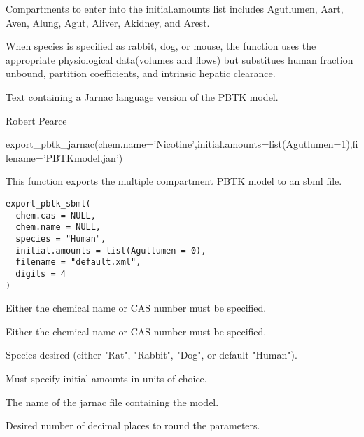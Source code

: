 \documentclass[a4paper]{book}
\begin{document}
%
\begin{Details}\relax
Compartments to enter into the initial.amounts list includes Agutlumen,
Aart, Aven, Alung, Agut, Aliver, Akidney, and Arest.

When species is specified as rabbit, dog, or mouse, the function uses the
appropriate physiological data(volumes and flows) but substitues human
fraction unbound, partition coefficients, and intrinsic hepatic clearance.
\end{Details}
%
\begin{Value}
Text containing a Jarnac language version of the PBTK model.
\end{Value}
%
\begin{Author}\relax
Robert Pearce
\end{Author}
%
\begin{Examples}
\begin{ExampleCode}


export_pbtk_jarnac(chem.name='Nicotine',initial.amounts=list(Agutlumen=1),filename='PBTKmodel.jan')


\end{ExampleCode}
\end{Examples}
%
\begin{Description}\relax
This function exports the multiple compartment PBTK model to an sbml file.
\end{Description}
%
\begin{Usage}
\begin{verbatim}
export_pbtk_sbml(
  chem.cas = NULL,
  chem.name = NULL,
  species = "Human",
  initial.amounts = list(Agutlumen = 0),
  filename = "default.xml",
  digits = 4
)
\end{verbatim}
\end{Usage}
%
\begin{Arguments}
\begin{ldescription}
\item[\code{chem.cas}] Either the chemical name or CAS number must be specified.

\item[\code{chem.name}] Either the chemical name or CAS number must be specified.

\item[\code{species}] Species desired (either "Rat", "Rabbit", "Dog", or default
"Human").

\item[\code{initial.amounts}] Must specify initial amounts in units of choice.

\item[\code{filename}] The name of the jarnac file containing the model.

\item[\code{digits}] Desired number of decimal places to round the parameters.
\end{ldescription}
\end{Arguments}
\end{document}
